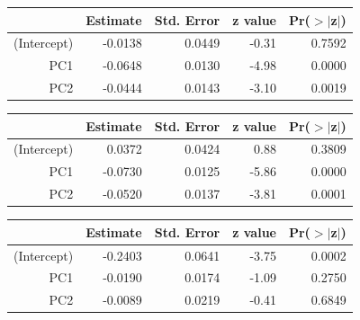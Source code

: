 \documentclass[a4paper,12pt]{Latex/Classes/PhDthesisPSnPDF}
\begin{document}
\begin{center}
\begin{table}[ht]
\centering
\begin{tabular}{rrrrr}
  \hline
 & Estimate & Std. Error & z value & Pr($>$$|$z$|$) \\ 
  \hline
(Intercept) & -0.0138 & 0.0449 & -0.31 & 0.7592 \\ 
  PC1 & -0.0648 & 0.0130 & -4.98 & 0.0000 \\ 
  PC2 & -0.0444 & 0.0143 & -3.10 & 0.0019 \\ 
   \hline
\end{tabular}
\end{table}\end{center}
\begin{center}
\begin{table}[ht]
\centering
\begin{tabular}{rrrrr}
  \hline
 & Estimate & Std. Error & z value & Pr($>$$|$z$|$) \\ 
  \hline
(Intercept) & 0.0372 & 0.0424 & 0.88 & 0.3809 \\ 
  PC1 & -0.0730 & 0.0125 & -5.86 & 0.0000 \\ 
  PC2 & -0.0520 & 0.0137 & -3.81 & 0.0001 \\ 
   \hline
\end{tabular}
\end{table}\end{center}

\newpage

\begin{center}
\begin{table}[ht]
\centering
\begin{tabular}{rrrrr}
  \hline
 & Estimate & Std. Error & z value & Pr($>$$|$z$|$) \\ 
  \hline
(Intercept) & -0.2403 & 0.0641 & -3.75 & 0.0002 \\ 
  PC1 & -0.0190 & 0.0174 & -1.09 & 0.2750 \\ 
  PC2 & -0.0089 & 0.0219 & -0.41 & 0.6849 \\ 
   \hline
\end{tabular}
\end{table}\end{center}
\end{document}
